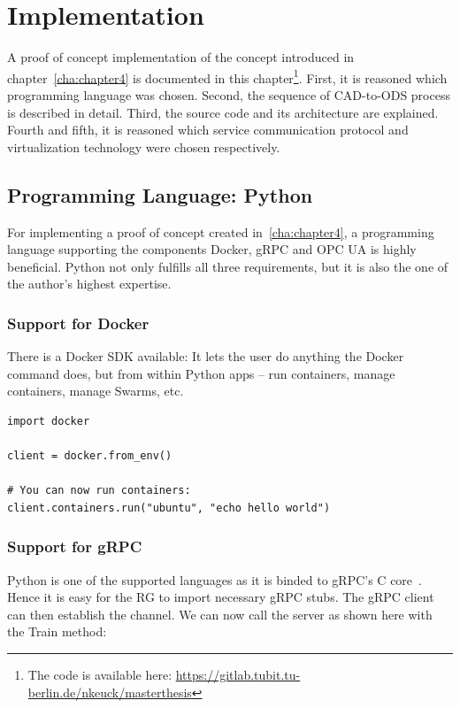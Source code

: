 \chapter{Implementation\label{cha:chapter5}}
A proof of concept implementation of the concept introduced in chapter~\ref{cha:chapter4} is documented in this chapter\footnote{The code is available here: \url{https://gitlab.tubit.tu-berlin.de/nkeuck/masterthesis}}. First, it is reasoned which programming language was chosen. Second, the sequence of CAD-to-ODS process is described in detail. Third, the source code and its architecture are explained. Fourth and fifth, it is reasoned which service communication protocol and virtualization technology were chosen respectively.

\section{Programming Language: Python}
For implementing a proof of concept created in~\ref{cha:chapter4}, a programming language supporting the components Docker, gRPC and OPC UA is highly beneficial. Python not only fulfills all three requirements, but it is also the one of the author's highest expertise.

\subsection{Support for Docker}
There is a Docker SDK available: It lets the user do anything the Docker command does, but from within Python apps – run containers, manage containers, manage Swarms, etc.~\cite{Docker-Py-Documentation2019Docker2019}
\begin{verbatim}
import docker

client = docker.from_env()

# You can now run containers:
client.containers.run("ubuntu", "echo hello world")
\end{verbatim}

\subsection{Support for gRPC}
\label{sec:grpcpython}
Python is one of the supported languages as it is binded to gRPC's C core~\cite{gRPC-Documentation2019Last2019}. Hence it is easy for the RG to import necessary gRPC stubs. The gRPC client can then establish the channel. We can now call the server as shown here with the Train method:


